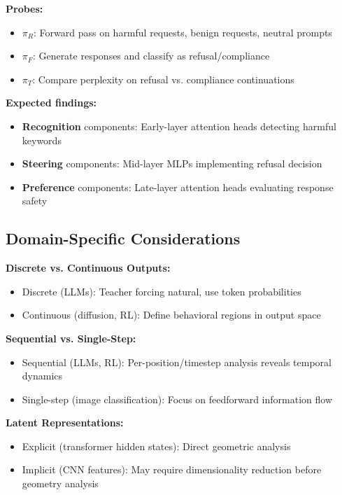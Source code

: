 \documentclass[11pt]{article}
\begin{document}
\noindent\textbf{Probes:}
\begin{itemize}[nosep]
\item $\pi_R$: Forward pass on harmful requests, benign requests, neutral prompts
\item $\pi_F$: Generate responses and classify as refusal/compliance
\item $\pi_T$: Compare perplexity on refusal vs. compliance continuations
\end{itemize}

\noindent\textbf{Expected findings:}
\begin{itemize}[nosep]
\item \textbf{Recognition} components: Early-layer attention heads detecting harmful keywords
\item \textbf{Steering} components: Mid-layer MLPs implementing refusal decision
\item \textbf{Preference} components: Late-layer attention heads evaluating response safety
\end{itemize}

\subsection{Domain-Specific Considerations}
\label{sec:domain-specific-considerations}

\noindent\textbf{Discrete vs. Continuous Outputs:}
\begin{itemize}[nosep]
\item Discrete (LLMs): Teacher forcing natural, use token probabilities
\item Continuous (diffusion, RL): Define behavioral regions in output space
\end{itemize}

\noindent\textbf{Sequential vs. Single-Step:}
\begin{itemize}[nosep]
\item Sequential (LLMs, RL): Per-position/timestep analysis reveals temporal dynamics
\item Single-step (image classification): Focus on feedforward information flow
\end{itemize}

\begin{samepage}
\noindent\textbf{Latent Representations:}
\begin{itemize}[nosep]
\item Explicit (transformer hidden states): Direct geometric analysis
\item Implicit (CNN features): May require dimensionality reduction before geometry analysis
\end{itemize}
\end{samepage}
\end{document}

